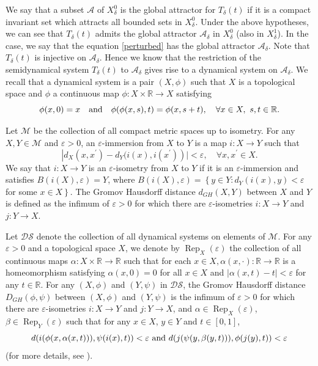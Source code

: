 \documentclass[11pt]{amsart}
\begin{document}
We say that a subset $\mathcal A$ of $X^0_{\delta}$ is the global attractor for $T_\delta (t)$ if it is a compact invariant set which attracts all bounded sets in $X^0_{\delta}$.
Under the above hypotheses, we can see that  $T_\delta (t)$ admits the global attractor $\mathcal{A}_\delta $  in $X^0_{\delta}$ (also in $X^1_{\delta}$). In the case, we say that the equation \eqref{perturbed} has the global attractor  $\mathcal{A}_\delta $.  Note that $T_\delta (t)$ is injective on  $\mathcal{A}_\delta $. Hence we know that the restriction of the semidynamical system $T_\delta (t)$ to $\mathcal{A}_\delta $ gives rise to a dynamical system on $\mathcal A_\delta$. We recall that a dynamical system is a pair $(X, \phi)$ such that $X$ is a topological space and $\phi$ a continuous map $\phi: X \times \mathbb R \to X$ satisfying 
$$\phi(x, 0) =x \quad {\rm and}\quad \phi(\phi(x, s), t)=\phi(x, s+t), \quad \forall x \in X,  ~ s,t \in \mathbb R.$$



Let $\mathcal{M}$ be the collection of all compact metric spaces up to isometry.
For any $X, Y \in \mathcal{M}$ and $\varepsilon>0$, an $\varepsilon$-immersion from $X$ to $Y$ is a map $i: X \rightarrow Y$ such that
$$
\left|d_{X}(x, x^{\prime})-d_{Y}(i(x), i(x^{\prime})\right)|<\varepsilon, \quad \forall x, x^{\prime} \in X.
$$
We say that $i: X \rightarrow Y$ is an $\varepsilon$-isometry from $X$ to $Y$ if it is an $\varepsilon$-immersion and satisfies $B(i(X), \varepsilon)=Y$, where $B(i(X), \varepsilon)=\left\{y \in Y: d_{Y}(i(x), y)<\varepsilon\right.$ for some $\left.x \in X\right\}$. The Gromov Hausdorff distance $d_{G H}(X, Y)$ between $X$ and $Y$ is defined as the infimum of $\varepsilon>0$ for which there are $\varepsilon$-isometries $i: X \rightarrow Y$ and $j: Y \rightarrow X$.


Let $\mathcal{DS}$ denote the collection of all dynamical systems on elements of $\mathcal{M}$.
For any $\varepsilon>0$ and a topological space $X$, we denote by $\operatorname{Rep}_{X}(\varepsilon)$ the collection of all continuous maps $\alpha: X \times \mathbb{R} \rightarrow \mathbb{R}$ such that for each $x \in X, \alpha(x,\cdot): \mathbb{R} \rightarrow \mathbb{R}$ is a homeomorphism satisfying $\alpha(x, 0)=0$ for all $x \in X$ and $|\alpha(x, t)-t|<\varepsilon$ for any $t \in \mathbb{R}$. For any $(X, \phi)$ and $(Y, \psi)$ in  $\mathcal{DS}$, the Gromov Hausdorff distance $ D_{GH}(\phi, \psi) $ between $(X, \phi)$ and $(Y, \psi)$  is the infimum of $\varepsilon>0$ for which there are $\varepsilon$-isometries $i: X \rightarrow Y$ and $j: Y \rightarrow X$, and $\alpha \in \operatorname{Rep}_{X}(\varepsilon)$, $\beta\in \operatorname{Rep}_{Y}(\varepsilon)$ such that for any $x\in X$, $y\in Y$ and $t\in [0,1]$,
$$d(i(\phi(x, \alpha(x,t))),\psi(i(x),t))<\varepsilon \text{ and }\\d(j(\psi(y, \beta(y,t))),\phi(j(y),t))<\varepsilon$$
(for more details, see \cite{LM}).
\end{document}
